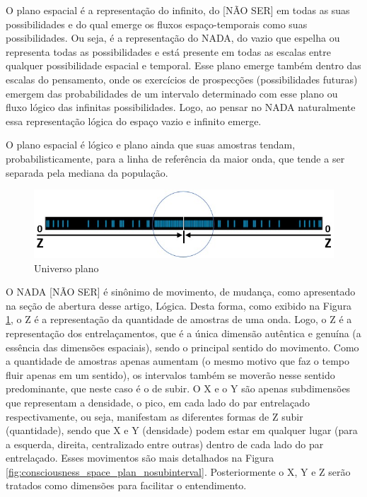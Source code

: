 O plano espacial é a representação do infinito, do [NÃO SER] em todas as suas possibilidades e do qual emerge os fluxos espaço-temporais como suas possibilidades. Ou seja, é a representação do NADA, do vazio que espelha ou representa todas as possibilidades e está presente em todas as escalas entre qualquer possibilidade espacial e temporal. Esse plano emerge também dentro das escalas do pensamento, onde os exercícios de prospecções (possibilidades futuras) emergem das probabilidades de um intervalo determinado com esse plano ou fluxo lógico das infinitas possibilidades. Logo, ao pensar no NADA naturalmente essa representação lógica do espaço vazio e infinito emerge.

O plano espacial é lógico e plano ainda que suas amostras tendam, probabilisticamente, para a linha de referência da maior onda, que tende a ser separada pela mediana da população.
	\begin{figure}[H]
	\caption{Universo plano}
	\label{fig:consciousness_flat_universe}
	\centering
	\includegraphics[scale=.6]{sections/images/consciousness_flat_universe.jpg}
	\end{figure}

O NADA [NÃO SER] é sinônimo de movimento, de mudança, como apresentado na seção de abertura desse artigo, Lógica. Desta forma, como exibido na Figura \ref{fig:consciousness_flat_universe}, o Z é a representação da quantidade de amostras de uma onda. Logo, o Z é a representação dos entrelaçamentos, que é a única dimensão autêntica e genuína (a essência das dimensões espaciais), sendo o principal sentido do movimento. Como a quantidade de amostras apenas aumentam (o mesmo motivo que faz o tempo fluir apenas em um sentido), os intervalos também se moverão nesse sentido predominante, que neste caso é o de subir. O X e o Y são apenas subdimensões que representam a densidade, o pico, em cada lado do par entrelaçado respectivamente, ou seja, manifestam as diferentes formas de Z subir (quantidade), sendo que X e Y (densidade) podem estar em qualquer lugar (para a esquerda, direita, centralizado entre outras) dentro de cada lado do par entrelaçado. Esses movimentos são mais detalhados na Figura \ref{fig:consciousness_space_plan_nosubinterval}. Posteriormente o X, Y e Z serão tratados como dimensões para facilitar o entendimento.

